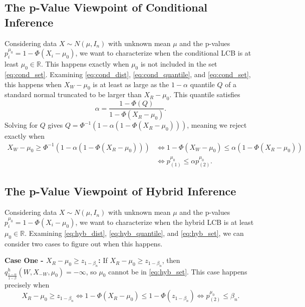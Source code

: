 \documentclass{article}
\newcommand{\R}{\mathbb{R}}
\begin{document}
\begin{appendix}
\subsection{The p-Value Viewpoint of Conditional Inference}
\label{sec:cond_appdx}

Considering data $X \sim N(\mu, I_n)$ with unknown mean $\mu$ and the p-values $p^{\mu_0
}_i = 1 - \Phi(X_i - \mu_0)$, we want to characterize when the conditional LCB is at least $\mu_0 \in \R$. This happens exactly when $\mu_0$ is not included in the set \eqref{eq:cond_set}. Examining \eqref{eq:cond_dist}, \eqref{eq:cond_quantile}, and \eqref{eq:cond_set}, this happens when $X_W - \mu_0$ is at least as large as the $1-\alpha$ quantile $Q$ of a standard normal truncated to be larger than $X_R - \mu_0$. This quantile satisfies 
    \begin{equation*}
        \alpha = \frac{1 - \Phi(Q) }{1 - \Phi(X_R - \mu_0) }.
    \end{equation*}
Solving for $Q$ gives $Q = \Phi^{-1}(1 - \alpha(1 - \Phi(X_R - \mu_0)))$, meaning we reject exactly when 
\begin{align*}
    X_{W} - \mu_0 \geq \Phi^{-1}(1 - \alpha(1 - \Phi(X_{R} - \mu_0))) &\iff 1 - \Phi(X_{W} - \mu_0) \leq \alpha(1 - \Phi(X_{R} - \mu_0))\\
    &\iff p^{\mu_0}_{(1)} \leq \alpha p^{\mu_0}_{(2)}.
\end{align*}


\subsection{The p-Value Viewpoint of Hybrid Inference}
\label{sec:hybrid_appdx}

Considering data $X \sim N(\mu, I_n)$ with unknown mean $\mu$ and the p-values $p^{\mu_0
}_i = 1 - \Phi(X_i - \mu_0)$, we want to characterize when the hybrid LCB is at least $\mu_0 \in \R$. Examining \eqref{eq:hyb_dist}, \eqref{eq:hyb_quantile}, and \eqref{eq:hyb_set}, we can consider two cases to figure out when this happens. \newline 


\noindent \textbf{Case One - $X_R - \mu_0 \geq z_{1 - \beta_n}$:} If $X_R - \mu_0 \geq z_{1 - \beta_n}$, then $q^h_{\frac{1-\alpha}{1-\beta}}(W, X_{-W}, \mu_0) = -\infty$, so $\mu_0$ cannot be in \eqref{eq:hyb_set}. This case happens precisely when 
\begin{equation*}
    X_R-\mu_0 \geq z_{1 - \beta_n} \iff 1 - \Phi(X_R - \mu_0) \leq 1 - \Phi(z_{1- \beta_n}) \iff p^{\mu_0}_{(2)} \leq \beta_n.
\end{equation*}


\end{appendix}
\end{document}
